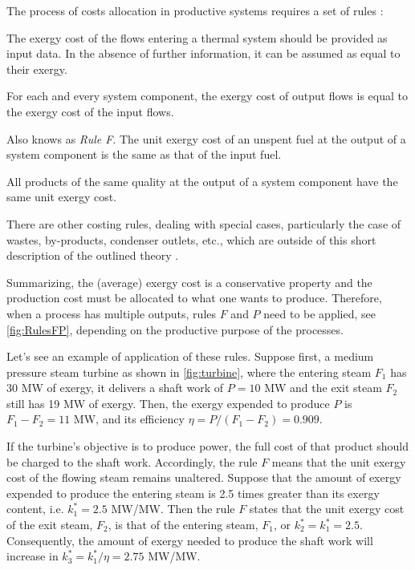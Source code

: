 \documentclass[energies,article,submit,moreauthors,pdftex]{Definitions/mdpi}
\begin{document}
\noindent The process of costs allocation in productive systems requires a set of rules  \cite{Lozano1993,Tsatsaronis2007}:
\begin{description}[font=\normalfont\itshape]		
	\item[Resources Rule:] The exergy cost of the flows entering a thermal system should be provided as input data. In the absence of further information, it can be assumed as equal to their exergy.
	\item[Cost Conservation Rule:] For each and every system component, the exergy cost of output flows is equal to the exergy cost of the input flows.
	\item[Unspent Fuel Rule:] Also knows as \emph{Rule F}. The unit exergy cost of an unspent fuel at the output of a system component is the same as that of the input fuel. 
	\item[Co-products Rule:] All products of the same quality at the output of a system component have the same unit exergy cost. 
\end{description}
There are other costing rules, dealing with special cases, particularly the case of wastes, by-products, condenser outlets, etc., which are outside of this short description of the outlined theory \cite{Torres2008}.

Summarizing, the (average) exergy cost is a conservative property and the production cost must be allocated to what one wants to produce. Therefore, when a process has multiple outputs, rules $F$ and $P$ need to be applied, see \cref{fig:RulesFP}, depending on the productive purpose of the processes. 

Let's see an example of application of these rules. Suppose first, a medium pressure steam turbine as shown in \cref{fig:turbine}, where the entering steam $F_1$ has 30 MW of exergy, it delivers a shaft work of $P=10$ MW and the exit steam $F_2$ still has 19 MW of exergy. Then, the exergy expended to produce $P$ is $F_1-F_2=11$ MW, and its efficiency $\eta=P/(F_1-F_2)=0.909$.

If the turbine's objective is to produce power, the full cost of that product should be charged to the shaft work. Accordingly, the rule $F$ means that the unit exergy cost of the flowing steam remains unaltered. Suppose that the amount of exergy expended to produce the entering steam is 2.5 times greater than its exergy content, i.e. $k_1^*=2.5$ MW/MW. Then the rule $F$ states that the unit exergy cost of the exit steam, $F_2$, is that of the entering steam, $F_1$, or $k_2^*=k_1^*=2.5$. Consequently, the amount of exergy needed to produce the shaft work will increase in $k_3^*=k_1^*/\eta=2.75$ MW/MW.
\end{document}
